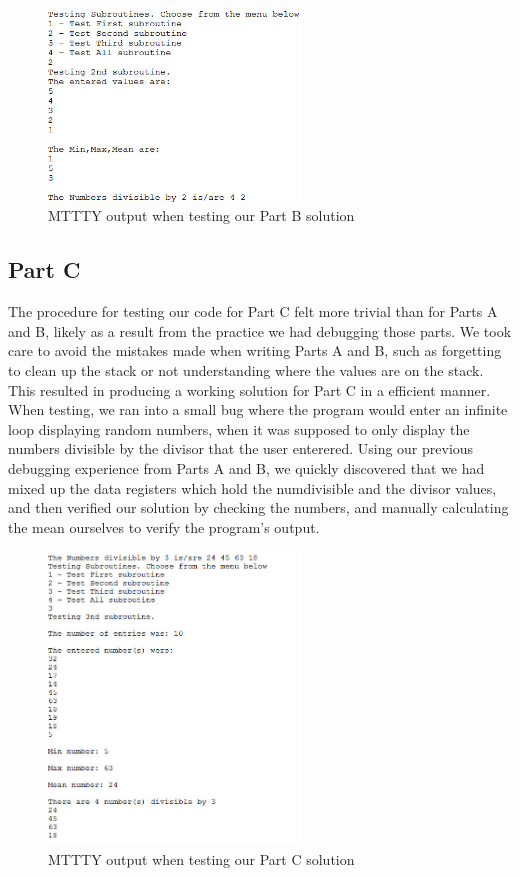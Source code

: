\documentclass[letterpaper]{article}
\begin{document}
    \begin{figure}[H]
      \centering
      \includegraphics[width=0.6\textwidth]{partb.jpg}
      \caption{MTTTY output when testing our Part B solution}
    \end{figure}

    \subsection{Part C}
      The procedure for testing our code for Part C felt more trivial
      than for Parts A and B, likely as a result from the practice
      we had debugging those parts. We took care to avoid the
      mistakes made when writing Parts A and B, such as forgetting
      to clean up the stack or not understanding where the values
      are on the stack. This resulted in producing a working solution for
      Part C in a efficient manner. When testing, we ran into a small bug where
      the program would enter an infinite loop displaying random numbers, when
      it was supposed to only display the numbers divisible by the divisor that the
      user enterered. Using our previous debugging experience from Parts A and
      B, we quickly discovered that we had mixed up the data registers which hold
      the numdivisible and the divisor values, and then verified our
      solution by checking the numbers, and manually calculating the mean ourselves
      to verify the program's output.

      \begin{figure}[H]
        \centering
        \includegraphics[width=0.6\textwidth]{partc.jpg}
        \caption{MTTTY output when testing our Part C solution}
      \end{figure}
\end{document}
